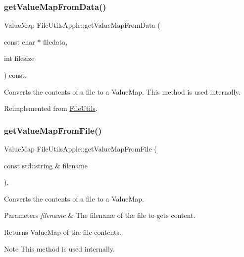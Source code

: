 \mbox{\label{classFileUtilsApple_a5ecaabfb986144039b4adb55ac463f95}} 
\subsubsection{\texorpdfstring{get\+Value\+Map\+From\+Data()}{getValueMapFromData()}\hspace{0.1cm}{\footnotesize\ttfamily [2/2]}}
{\footnotesize\ttfamily Value\+Map File\+Utils\+Apple\+::get\+Value\+Map\+From\+Data (\begin{DoxyParamCaption}\item[{const char $\ast$}]{filedata,  }\item[{int}]{filesize }\end{DoxyParamCaption}) const\hspace{0.3cm}{\ttfamily [override]}, {\ttfamily [virtual]}}

Converts the contents of a file to a Value\+Map. This method is used internally. 

Reimplemented from \hyperlink{classFileUtils_a9c882af1acde6d249e35713e82b53607}{File\+Utils}.

\mbox{\label{classFileUtilsApple_a29093cea02fd4a89629ffb087e0f480b}} 
\subsubsection{\texorpdfstring{get\+Value\+Map\+From\+File()}{getValueMapFromFile()}\hspace{0.1cm}{\footnotesize\ttfamily [1/2]}}
{\footnotesize\ttfamily Value\+Map File\+Utils\+Apple\+::get\+Value\+Map\+From\+File (\begin{DoxyParamCaption}\item[{const std\+::string \&}]{filename }\end{DoxyParamCaption})\hspace{0.3cm}{\ttfamily [override]}, {\ttfamily [virtual]}}

Converts the contents of a file to a Value\+Map. 
\begin{DoxyParams}{Parameters}
{\em filename} & The filename of the file to gets content. \\
\hline
\end{DoxyParams}
\begin{DoxyReturn}{Returns}
Value\+Map of the file contents. 
\end{DoxyReturn}
\begin{DoxyNote}{Note}
This method is used internally. 
\end{DoxyNote}


